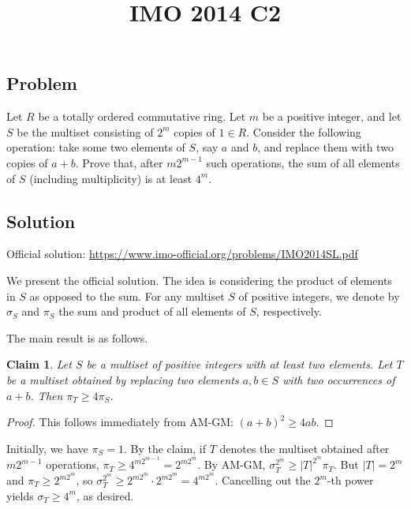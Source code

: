 \documentclass{article}
\title{IMO 2014 C2}
\author{}
\date{}
\newtheorem*{claim}{Claim}
\begin{document}
\maketitle



\subsection*{Problem}

Let $R$ be a totally ordered commutative ring.
Let $m$ be a positive integer, and let $S$ be the multiset consisting of $2^m$ copies of $1 \in R$.
Consider the following operation: take some two elements of $S$, say $a$ and $b$, and replace them with two copies of $a + b$.
Prove that, after $m 2^{m - 1}$ such operations, the sum of all elements of $S$ (including multiplicity) is at least $4^m$.



\subsection*{Solution}

Official solution: \url{https://www.imo-official.org/problems/IMO2014SL.pdf}

We present the official solution.
The idea is considering the product of elements in $S$ as opposed to the sum.
For any multiset $S$ of positive integers, we denote by $\sigma_S$ and $\pi_S$ the sum and product of all elements of $S$, respectively.

The main result is as follows.

\begin{claim}
Let $S$ be a multiset of positive integers with at least two elements.
Let $T$ be a multiset obtained by replacing two elements $a, b \in S$ with two occurrences of $a + b$.
Then $\pi_T \geq 4 \pi_S$.
\end{claim}
\begin{proof}
This follows immediately from AM-GM: $(a + b)^2 \geq 4ab$.
\end{proof}

Initially, we have $\pi_S = 1$.
By the claim, if $T$ denotes the multiset obtained after $m 2^{m - 1}$ operations, $\pi_T \geq 4^{m 2^{m - 1}} = 2^{m 2^m}$.
By AM-GM, $\sigma_T^{2^m} \geq |T|^{2^m} \pi_T$.
But $|T| = 2^m$ and $\pi_T \geq 2^{m 2^m}$, so $\sigma_T^{2^m} \geq 2^{m 2^m} \cdot 2^{m 2^m} = 4^{m 2^m}$.
Cancelling out the $2^m$-th power yields $\sigma_T \geq 4^m$, as desired.
\end{document}

